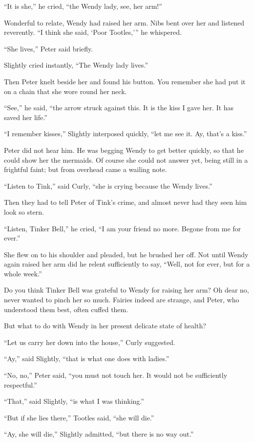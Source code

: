 “It is she,” he cried, “the Wendy lady, see, her arm!”

Wonderful to relate, Wendy had raised her arm.
Nibs bent over her and listened reverently.
“I think she said, ‘Poor Tootles,’” he whispered.

“She lives,” Peter said briefly.

Slightly cried instantly, “The Wendy lady lives.”

Then Peter knelt beside her and found his button.
You remember she had put it on a chain that she wore round her neck.

“See,” he said, “the arrow struck against this.
It is the kiss I gave her.
It has saved her life.”

“I remember kisses,” Slightly interposed quickly, “let me see it.
Ay, that’s a kiss.”

Peter did not hear him.
He was begging Wendy to get better quickly, so that he could show her the mermaids.
Of course she could not answer yet, being still in a frightful faint;
but from overhead came a wailing note.

“Listen to Tink,” said Curly, “she is crying because the Wendy lives.”

Then they had to tell Peter of Tink’s crime, and almost never had they seen him look so stern.

“Listen, Tinker Bell,” he cried, “I am your friend no more.
Begone from me for ever.”

She flew on to his shoulder and pleaded, but he brushed her off.
Not until Wendy again raised her arm did he relent sufficiently to say,
“Well, not for ever, but for a whole week.”

Do you think Tinker Bell was grateful to Wendy for raising her arm?
Oh dear no, never wanted to pinch her so much.
Fairies indeed are strange, and Peter, who understood them best, often cuffed them.

But what to do with Wendy in her present delicate state of health?

“Let us carry her down into the house,” Curly suggested.

“Ay,” said Slightly, “that is what one does with ladies.”

“No, no,” Peter said, “you must not touch her.
It would not be sufficiently respectful.”

“That,” said Slightly, “is what I was thinking.”

“But if she lies there,” Tootles said, “she will die.”

“Ay, she will die,” Slightly admitted, “but there is no way out.”

